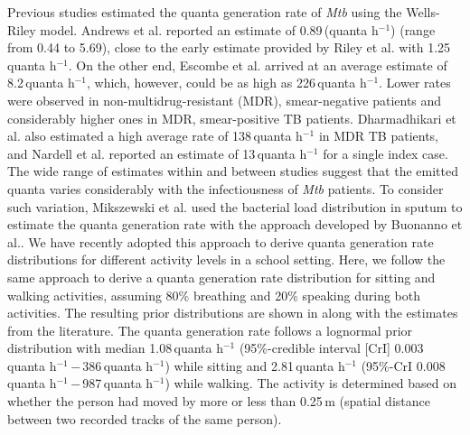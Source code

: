 \documentclass[fleqn,11pt]{wlscirep_supp}
\begin{document}
Previous studies estimated the quanta generation rate of \emph{Mtb} using the Wells-Riley model\cite{Andrews2014JID,Riley1962ARRD,Escombe2008PLoSMed,Nardell1991ARRD,Dharmadhikari2012AJRCCM}. Andrews et al.\cite{Andrews2014JID} reported an estimate of 0.89\,(quanta h$^{-1}$) (range from 0.44 to 5.69), close to the early estimate provided by Riley et al.\cite{Riley1962ARRD} with 1.25\,quanta h$^{-1}$. On the other end, Escombe et al.\cite{Escombe2008PLoSMed} arrived at an average estimate of 8.2\,quanta h$^{-1}$, which, however, could be as high as 226\,quanta h$^{-1}$. Lower rates were observed in non-multidrug-resistant (MDR), smear-negative patients and considerably higher ones in MDR, smear-positive TB patients\cite{Escombe2008PLoSMed}. Dharmadhikari et al.\cite{Dharmadhikari2012AJRCCM} also estimated a high average rate of 138\,quanta h$^{-1}$ in MDR TB patients, and Nardell et al.\cite{Nardell1991ARRD} reported an estimate of 13\,quanta h$^{-1}$ for a single index case. The wide range of estimates within and between studies suggest that the emitted quanta varies considerably with the infectiousness of \emph{Mtb} patients\cite{Wurie2016BMJ}. To consider such variation, Mikszewski et al.\cite{Mikszewski2021GF} used the bacterial load distribution in sputum to estimate the quanta generation rate with the approach developed by Buonanno et al.\cite{Buonanno2020EI}. We have recently adopted this approach to derive quanta generation rate distributions for different activity levels in a school setting\cite{Banholzer2024PGPH}. Here, we follow the same approach to derive a quanta generation rate distribution for sitting and walking activities, assuming 80\% breathing and 20\% speaking during both activities. The resulting prior distributions are shown in  along with the estimates from the literature. The quanta generation rate follows a lognormal prior distribution with median 1.08\,quanta h$^{-1}$ (95\%-credible interval [CrI] 0.003\,quanta h$^{-1}$\,$-$\,386\,quanta h$^{-1}$) while sitting and 2.81\,quanta h$^{-1}$ (95\%-CrI 0.008\,quanta h$^{-1}$\,$-$\,987\,quanta h$^{-1}$) while walking. The activity is determined based on whether the person had moved by more or less than 0.25\,m (spatial distance between two recorded tracks of the same person). 
\end{document}

